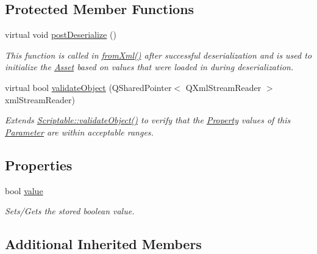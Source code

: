 \subsection*{Protected Member Functions}
\begin{DoxyCompactItemize}
\item 
virtual void \hyperlink{class_picto_1_1_boolean_parameter_a189473e24b9688ece1003c7282887ea6}{post\-Deserialize} ()
\begin{DoxyCompactList}\small\item\em This function is called in \hyperlink{class_picto_1_1_asset_a8bed4da09ecb1c07ce0dab313a9aba67}{from\-Xml()} after successful deserialization and is used to initialize the \hyperlink{class_picto_1_1_asset}{Asset} based on values that were loaded in during deserialization. \end{DoxyCompactList}\item 
virtual bool \hyperlink{class_picto_1_1_boolean_parameter_a3ef6da062fc65cd28000615c27ad3f17}{validate\-Object} (Q\-Shared\-Pointer$<$ Q\-Xml\-Stream\-Reader $>$ xml\-Stream\-Reader)
\begin{DoxyCompactList}\small\item\em Extends \hyperlink{class_picto_1_1_scriptable_ab6e2944c43a3b5d418bf7b251594386d}{Scriptable\-::validate\-Object()} to verify that the \hyperlink{class_picto_1_1_property}{Property} values of this \hyperlink{class_picto_1_1_parameter}{Parameter} are within acceptable ranges. \end{DoxyCompactList}\end{DoxyCompactItemize}
\subsection*{Properties}
\begin{DoxyCompactItemize}
\item 
\hypertarget{class_picto_1_1_boolean_parameter_abfcc27251fe909eaa1fc27615dbf1f0a}{bool \hyperlink{class_picto_1_1_boolean_parameter_abfcc27251fe909eaa1fc27615dbf1f0a}{value}}\label{class_picto_1_1_boolean_parameter_abfcc27251fe909eaa1fc27615dbf1f0a}

\begin{DoxyCompactList}\small\item\em Sets/\-Gets the stored boolean value. \end{DoxyCompactList}\end{DoxyCompactItemize}
\subsection*{Additional Inherited Members}



